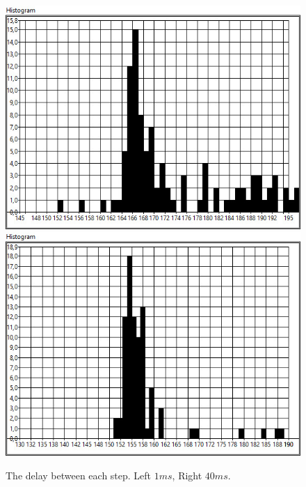\begin{figure}[ht]
    \centering
        \includegraphics[scale=0.2] {./mesurment/data/Expected_170,0__Mean_176,02__Distrubution_13,567648_Rotating_1ms}
        \includegraphics[scale=0.2] {./mesurment/data/Expected_160,0__Mean_156,97__Distrubution_6,850402_Rotating_40ms}
  \caption{The delay between each step. Left $1ms$, Right $40ms$.}
  \label{fig:test-hist}
\end{figure}

